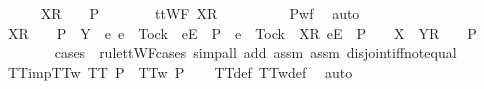 \begin{isabellebody}
\ \ \ \ \isamarkupfalse%
\ {\isachardoublequoteopen}{\isacharbrackleft}X{\isacharbrackright}\isactrlsub R\ {\isacharhash}\ {\isasymsigma}\ {\isasymin}\ P{\isachardoublequoteclose}\isanewline
\ \ \ \ \isamarkupfalse%
\ \isamarkupfalse%
\ {\isachardoublequoteopen}ttWF\ {\isacharparenleft}{\isacharbrackleft}X{\isacharbrackright}\isactrlsub R\ {\isacharhash}\ {\isasymsigma}{\isacharparenright}{\isachardoublequoteclose}\isanewline
\ \ \ \ \ \ \isamarkupfalse%
\ P{\isacharunderscore}wf\ \isamarkupfalse%
\ auto\isanewline
\ \ \ \ \isamarkupfalse%
\ \isamarkupfalse%
\ {\isachardoublequoteopen}{\isacharbrackleft}X{\isacharbrackright}\isactrlsub R\ {\isacharhash}\ {\isasymsigma}\ {\isasymin}\ P\ {\isasymLongrightarrow}\ Y\ {\isasyminter}\ {\isacharbraceleft}e{\isachardot}\ e\ {\isasymnoteq}\ Tock\ {\isasymand}\ {\isacharbrackleft}{\isacharbrackleft}e{\isacharbrackright}\isactrlsub E{\isacharbrackright}\ {\isasymin}\ P\ {\isasymor}\ e\ {\isacharequal}\ Tock\ {\isasymand}\ {\isacharbrackleft}{\isacharbrackleft}X{\isacharbrackright}\isactrlsub R{\isacharcomma}\ {\isacharbrackleft}e{\isacharbrackright}\isactrlsub E{\isacharbrackright}\ {\isasymin}\ P{\isacharbraceright}\ {\isacharequal}\ {\isacharbraceleft}{\isacharbraceright}\ {\isasymLongrightarrow}\ {\isacharbrackleft}X\ {\isasymunion}\ Y{\isacharbrackright}\isactrlsub R\ {\isacharhash}\ {\isasymsigma}\ {\isasymin}\ P\ {\isachardoublequoteclose}\isanewline
\ \ \ \ \ \ \isamarkupfalse%
\ {\isacharparenleft}cases\ {\isasymsigma}\ rule{\isacharcolon}ttWF{\isachardot}cases{\isacharcomma}\ simp{\isacharunderscore}all\ add{\isacharcolon}\ assm{}\ assm{}\ disjoint{\isacharunderscore}iff{\isacharunderscore}not{\isacharunderscore}equal{\isacharparenright}\isanewline
\ \ \isamarkupfalse%
\isanewline
{}\isamarkupfalse%
%
\endisatagproof
{\isafoldproof}%
%
\isadelimproof
\isanewline
%
\endisadelimproof
\isanewline
{}\isamarkupfalse%
\ TT{}{\isacharunderscore}imp{\isacharunderscore}TT{}w{\isacharcolon}\ {\isachardoublequoteopen}TT{}\ P\ {\isasymLongrightarrow}\ TT{}w\ P{\isachardoublequoteclose}\isanewline
%
\isadelimproof
\ \ %
\endisadelimproof
%
\isatagproof
{}\isamarkupfalse%
\ TT{}{\isacharunderscore}def\ TT{}w{\isacharunderscore}def\ \isamarkupfalse%
\ auto%
\endisatagproof
{\isafoldproof}%
%
\isadelimproof
\isanewline

\end{isabellebody}
